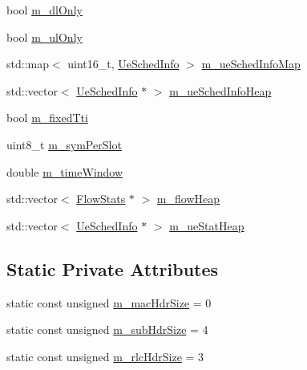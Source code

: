 \begin{DoxyCompactItemize}
bool \hyperlink{classns3_1_1MmWaveFlexTtiMaxRateMacScheduler_a56628e8b65ac83d0971cb578424a69d1}{m\+\_\+dl\+Only}
\item 
bool \hyperlink{classns3_1_1MmWaveFlexTtiMaxRateMacScheduler_ac5fe9ebd47ddd56e08672f4ab97d08be}{m\+\_\+ul\+Only}
\item 
std\+::map$<$ uint16\+\_\+t, \hyperlink{structns3_1_1MmWaveFlexTtiMaxRateMacScheduler_1_1UeSchedInfo}{Ue\+Sched\+Info} $>$ \hyperlink{classns3_1_1MmWaveFlexTtiMaxRateMacScheduler_ac8359b3799f29f5b49e0f2dd52acd0ab}{m\+\_\+ue\+Sched\+Info\+Map}
\item 
std\+::vector$<$ \hyperlink{structns3_1_1MmWaveFlexTtiMaxRateMacScheduler_1_1UeSchedInfo}{Ue\+Sched\+Info} $\ast$ $>$ \hyperlink{classns3_1_1MmWaveFlexTtiMaxRateMacScheduler_a3f28d5a262b7c403e63bb822bcb7cdfb}{m\+\_\+ue\+Sched\+Info\+Heap}
\item 
bool \hyperlink{classns3_1_1MmWaveFlexTtiMaxRateMacScheduler_ad0bf9dce4426af61282804b4a9b3c4da}{m\+\_\+fixed\+Tti}
\item 
uint8\+\_\+t \hyperlink{classns3_1_1MmWaveFlexTtiMaxRateMacScheduler_a2b43e927e4adbdc530bb8e52eba7dad5}{m\+\_\+sym\+Per\+Slot}
\item 
double \hyperlink{classns3_1_1MmWaveFlexTtiMaxRateMacScheduler_aaa92d0980a88e04f7c5905cbed748264}{m\+\_\+time\+Window}
\item 
std\+::vector$<$ \hyperlink{structns3_1_1MmWaveFlexTtiMaxRateMacScheduler_1_1FlowStats}{Flow\+Stats} $\ast$ $>$ \hyperlink{classns3_1_1MmWaveFlexTtiMaxRateMacScheduler_ab7efbde2b050b26442c6d9f9901f7217}{m\+\_\+flow\+Heap}
\item 
std\+::vector$<$ \hyperlink{structns3_1_1MmWaveFlexTtiMaxRateMacScheduler_1_1UeSchedInfo}{Ue\+Sched\+Info} $\ast$ $>$ \hyperlink{classns3_1_1MmWaveFlexTtiMaxRateMacScheduler_aa87c4d83cfc37af1f40280bc303594d6}{m\+\_\+ue\+Stat\+Heap}
\end{DoxyCompactItemize}
\subsection*{Static Private Attributes}
\begin{DoxyCompactItemize}
\item 
static const unsigned \hyperlink{classns3_1_1MmWaveFlexTtiMaxRateMacScheduler_a40edd3a27e18ff96032223f58c48cfbf}{m\+\_\+mac\+Hdr\+Size} = 0
\item 
static const unsigned \hyperlink{classns3_1_1MmWaveFlexTtiMaxRateMacScheduler_a0f2c8958e58101914ae43e9453f306c8}{m\+\_\+sub\+Hdr\+Size} = 4
\item 
static const unsigned \hyperlink{classns3_1_1MmWaveFlexTtiMaxRateMacScheduler_a9f8b40239ea7f57bd8cbaf641185cf98}{m\+\_\+rlc\+Hdr\+Size} = 3
\end{DoxyCompactItemize}
